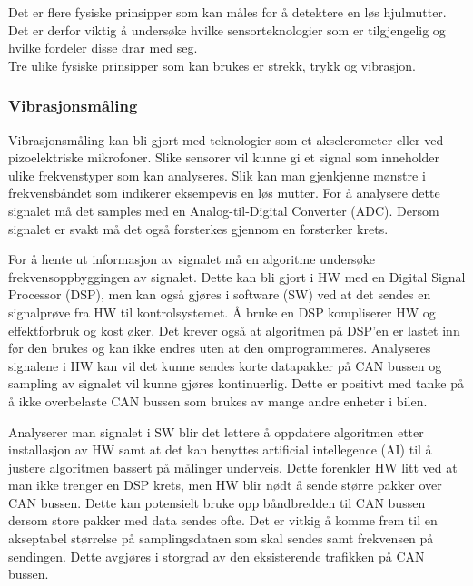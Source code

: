 Det er flere fysiske prinsipper som kan måles for å detektere en løs hjulmutter.
Det er derfor viktig å undersøke hvilke sensorteknologier som er tilgjengelig og
hvilke fordeler disse drar med seg. \\

Tre ulike fysiske prinsipper som kan brukes er strekk, trykk og vibrasjon. \\

\subsubsection{Vibrasjonsmåling}

Vibrasjonsmåling kan bli gjort med teknologier som et akselerometer eller ved
pizoelektriske mikrofoner. Slike sensorer vil kunne gi et signal som inneholder
ulike frekvenstyper som kan analyseres. Slik kan man gjenkjenne mønstre i
frekvensbåndet som indikerer eksempevis en løs mutter. For å analysere dette signalet må det
samples med en Analog-til-Digital Converter (ADC). Dersom signalet er svakt må det også forsterkes gjennom en
forsterker krets. 

For å hente ut informasjon av signalet må en algoritme undersøke
frekvensoppbyggingen av signalet. Dette kan bli gjort i HW med en Digital Signal Processor (DSP), men kan
også gjøres i software (SW) ved at det sendes en signalprøve fra HW til kontrolsystemet. Å
bruke en DSP kompliserer HW og effektforbruk og kost øker. Det krever også at algoritmen på DSP'en 
er lastet inn før den brukes og kan ikke endres uten at den omprogrammeres. Analyseres signalene i HW kan vil
det kunne sendes korte datapakker på CAN bussen og sampling av signalet vil kunne gjøres kontinuerlig. Dette er
positivt med tanke på å ikke overbelaste CAN bussen som brukes av mange andre enheter i bilen. 

Analyserer man signalet i SW blir det lettere å oppdatere algoritmen etter installasjon av HW
samt at det kan benyttes artificial intellegence (AI) til å justere algoritmen bassert på målinger underveis. 
Dette forenkler HW litt ved at man ikke trenger en DSP krets, men HW blir nødt å sende større pakker over CAN
bussen. Dette kan potensielt bruke opp båndbredden til CAN bussen dersom store pakker med data sendes ofte. 
Det er vitkig å komme frem til en akseptabel størrelse på samplingsdataen som skal sendes samt frekvensen på
sendingen. Dette avgjøres i storgrad av den eksisterende trafikken på CAN bussen.

%

